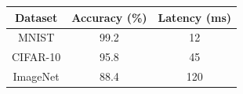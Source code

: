 \documentclass{article}
\begin{document}
\begin{tabular}{|c|c|c|}
\hline
Dataset & Accuracy (\%) & Latency (ms) \\
\hline
MNIST & 99.2 & 12 \\
CIFAR-10 & 95.8 & 45 \\
ImageNet & 88.4 & 120 \\
\hline
\end{tabular}
\end{document}

